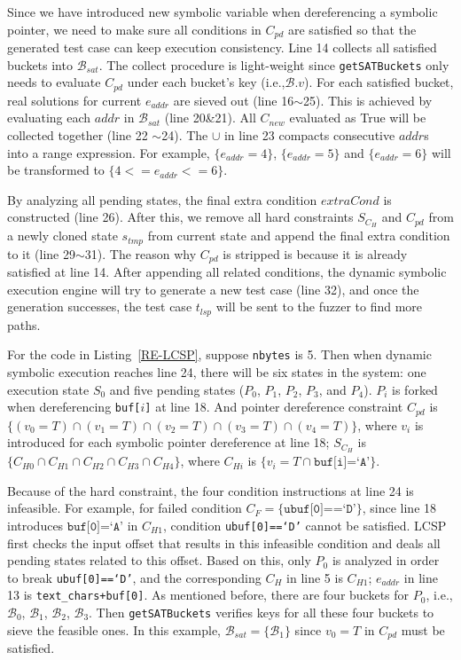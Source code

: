 \documentclass{cta-author}
\begin{document}
Since we have introduced new symbolic variable when dereferencing a symbolic pointer,
we need to make sure all conditions in $C_{pd}$ are satisfied so that the generated
test case can keep execution consistency.
Line 14 collects all satisfied buckets into $\mathcal{B}_{sat}$. The collect procedure
is light-weight since \texttt{getSATBuckets} only needs to evaluate $C_{pd}$
under each bucket's key (i.e.,$\mathcal{B}.v$).
For each satisfied bucket, real solutions for current $e_{addr}$ are sieved out 
(line 16$\sim$25). This is achieved by evaluating each $addr$ in $\mathcal{B}_{sat}$
(line 20\&21). All $C_{new}$ evaluated as True will be collected together (line 22
$\sim$24). The $\cup$ in line 23 compacts consecutive $addr$s into a range expression.
For example, $\{e_{addr}=4\}$, $\{e_{addr}=5\}$ and $\{e_{addr}=6\}$ will be transformed to
$\{4<=e_{addr}<=6\}$.

By analyzing all pending states, the final extra condition $extraCond$ is constructed
(line 26).
After this, we remove all hard constraints $S_{C_H}$ and $C_{pd}$ from a newly cloned state $s_{tmp}$
from current state and append
the final extra condition to it (line 29$\sim$31). 
The reason why $C_{pd}$ is stripped is because it is already satisfied at line 14.
After appending all related conditions, the dynamic symbolic execution 
engine will try to generate a new test case (line 32), and once the 
generation successes, the test case $t_{lsp}$ will be sent to the 
fuzzer to find more paths.

For the code in Listing~\ref{RE-LCSP}, suppose \texttt{nbytes} is 5. 
Then when dynamic symbolic execution reaches line 24, there will be 
six states in the system: one execution state $S_0$ and five pending 
states ($P_0$, $P_1$, $P_2$, $P_3$, and $P_4$). $P_i$ is forked when 
dereferencing \texttt{buf[$i$]} at line 18. And pointer dereference
constraint $C_{pd}$ is $\{(v_0=T)\cap (v_1=T)\cap (v_2=T)\cap (v_3=T)\cap (v_4=T)\}$,
where $v_i$ is introduced for each symbolic pointer dereference at
line 18; $S_{C_H}$ is $\{C_{H0}\cap C_{H1}\cap C_{H2}\cap C_{H3}\cap C_{H4}\}$,
where $C_{Hi}$ is $\{v_i=T\cap \texttt{buf[i]=`A'}\}$.

Because of the hard constraint, the four condition instructions at line 24
is infeasible. 
For example, for failed condition $C_F=\{\texttt{ubuf[0]==`D'}\}$, since line
18 introduces $\texttt{buf[0]=`A'}$ in $C_{H1}$, condition \texttt{ubuf[0]==`D'} cannot
be satisfied. LCSP first checks the input offset that results in this infeasible
condition and deals all pending states related to this offset. Based on this,
only $P_0$ is analyzed in order to break \texttt{ubuf[0]==`D'}, and the
corresponding $C_H$ in line 5 is $C_{H1}$; $e_{addr}$ in line 13 is
\texttt{\texttt{text\_chars+buf[0]}}. As mentioned before,
there are four buckets for $P_0$, i.e., $\mathcal{B}_0$, $\mathcal{B}_1$, $\mathcal{B}_2$,
$\mathcal{B}_3$. Then \texttt{getSATBuckets} verifies keys for all these four buckets 
to sieve the feasible ones. In this example, $\mathcal{B}_{sat}=\{\mathcal{B}_1\}$ since
$v_0=T$ in $C_{pd}$ must be satisfied. 
\end{document}
